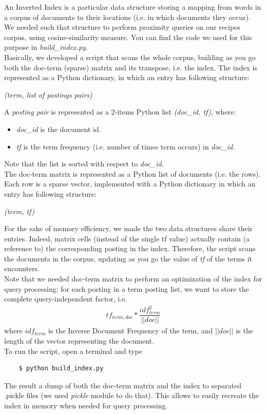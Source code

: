 An Inverted Index\cite{inv_ind} is a particular data structure storing a mapping from words in a corpus of documents to their locations (i.e. in which documents they occur). We needed such that structure to perform proximity queries on our recipes corpus, using cosine-similarity measure. You can find the code we used for this purpose in \textit{build\_index.py}.\\
Basically, we developed a script that scans the whole corpus, building as you go both the doc-term (sparse) matrix\cite{doc_term} and its transpose, i.e. the index. The index is represented as a Python dictionary, in which an entry has following structure:
\begin{center}
	\textit{(term, list of postings pairs)}
\end{center}
A \textit{posting pair} is represented as a 2-items Python list \textit{(doc\_id, tf)}, where:
\begin{itemize}
	\item \textit{doc\_id} is the document id.
	\item \textit{tf} is the term frequency (i.e. number of times term occurs) in \textit{doc\_id}.
\end{itemize}
Note that the list is sorted with respect to \textit{doc\_id}.\\
The doc-term matrix is represented as a Python list of documents (i.e. the rows). Each row is a sparse vector, implemented with a Python dictionary in which an entry has following structure:
\begin{center}
	\textit{(term, tf)}
\end{center}
For the sake of memory efficiency, we made the two data structures share their entries. Indeed, matrix cells (instead of the single tf value) actually contain (a reference to) the corresponding posting in the index. Therefore, the script scans the documents in the corpus, updating as you go the value of \textit{tf} of the terms it encounters.\\
Note that we needed doc-term matrix to perform an optimization of the index for query processing: for each posting in a term posting list, we want to store the complete query-independent factor, i.e.
\begin{align*}
	tf_{term,doc} * \dfrac{idf_{term}^2}{||doc||}
\end{align*}
where $idf_{term}$ is the Inverse Document Frequency\cite{tf_idf} of the term, and $||doc||$ is the length of the vector representing the document.\\
To run the script, open a terminal and type
\begin{lstlisting}
	$ python build_index.py
\end{lstlisting}
The result a dump of both the doc-term matrix and the index to separated .pickle files (we used \textit{pickle}\cite{pickle} module to do that). This allows to easily recreate the index in memory when needed for query processing. 


